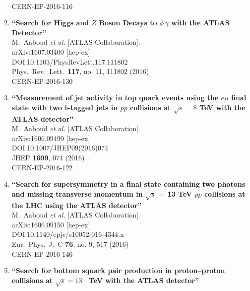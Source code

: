 \documentclass{article}
\begin{document}
\begin{enumerate}
  \\{}CERN-EP-2016-116
\item%
{\bf ``Search for Higgs and $Z$ Boson Decays to $\phi\,\gamma$ with the ATLAS Detector''}
  \\{}M.~Aaboud {\it et al.} [ATLAS Collaboration].
  \\{}arXiv:1607.03400 [hep-ex]
  \\{}DOI:10.1103/PhysRevLett.117.111802
  \\{}Phys.\ Rev.\ Lett.\  {\bf 117}, no. 11, 111802 (2016)
  \\{}CERN-EP-2016-130
\item%
{\bf ``Measurement of jet activity in top quark events using the $e\mu$ final state with two $b$-tagged jets in $pp$ collisions at $\sqrt{s}=8$ TeV with the ATLAS detector''}
  \\{}M.~Aaboud {\it et al.} [ATLAS Collaboration].
  \\{}arXiv:1606.09490 [hep-ex]
  \\{}DOI:10.1007/JHEP09(2016)074
  \\{}JHEP {\bf 1609}, 074 (2016)
  \\{}CERN-EP-2016-122
\item%
{\bf ``Search for supersymmetry in a final state containing two photons and missing transverse momentum in $\sqrt{s}$ = 13 TeV $pp$ collisions at the LHC using the ATLAS detector''}
  \\{}M.~Aaboud {\it et al.} [ATLAS Collaboration].
  \\{}arXiv:1606.09150 [hep-ex]
  \\{}DOI:10.1140/epjc/s10052-016-4344-x
  \\{}Eur.\ Phys.\ J.\ C {\bf 76}, no. 9, 517 (2016)
  \\{}CERN-EP-2016-146
\item%
{\bf ``Search for bottom squark pair production in proton–proton collisions at $\sqrt{s}=13$  TeV with the ATLAS detector''}

\end{enumerate}
\end{document}
